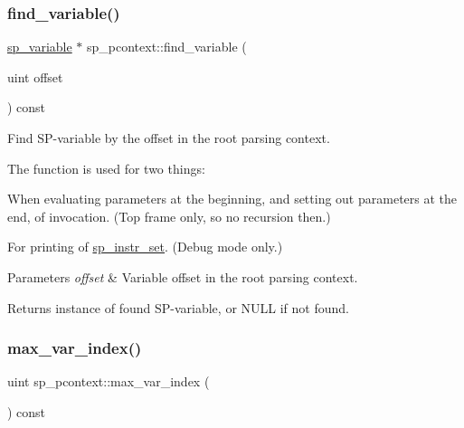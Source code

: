 \subsubsection{\texorpdfstring{find\+\_\+variable()}{find\_variable()}\hspace{0.1cm}{\footnotesize\ttfamily [2/2]}}
{\footnotesize\ttfamily \mbox{\hyperlink{classsp__variable}{sp\+\_\+variable}} $\ast$ sp\+\_\+pcontext\+::find\+\_\+variable (\begin{DoxyParamCaption}\item[{uint}]{offset }\end{DoxyParamCaption}) const}

Find SP-\/variable by the offset in the root parsing context.

The function is used for two things\+:
\begin{DoxyItemize}
\item When evaluating parameters at the beginning, and setting out parameters at the end, of invocation. (Top frame only, so no recursion then.)
\item For printing of \mbox{\hyperlink{classsp__instr__set}{sp\+\_\+instr\+\_\+set}}. (Debug mode only.)
\end{DoxyItemize}


\begin{DoxyParams}{Parameters}
{\em offset} & Variable offset in the root parsing context.\\
\hline
\end{DoxyParams}
\begin{DoxyReturn}{Returns}
instance of found SP-\/variable, or N\+U\+LL if not found. 
\end{DoxyReturn}
\mbox{\label{classsp__pcontext_a8e102fc7e3bb76e872b32bb8783df72f}} 
\subsubsection{\texorpdfstring{max\+\_\+var\+\_\+index()}{max\_var\_index()}}
{\footnotesize\ttfamily uint sp\+\_\+pcontext\+::max\+\_\+var\+\_\+index (\begin{DoxyParamCaption}{ }\end{DoxyParamCaption}) const\hspace{0.3cm}{\ttfamily [inline]}}

